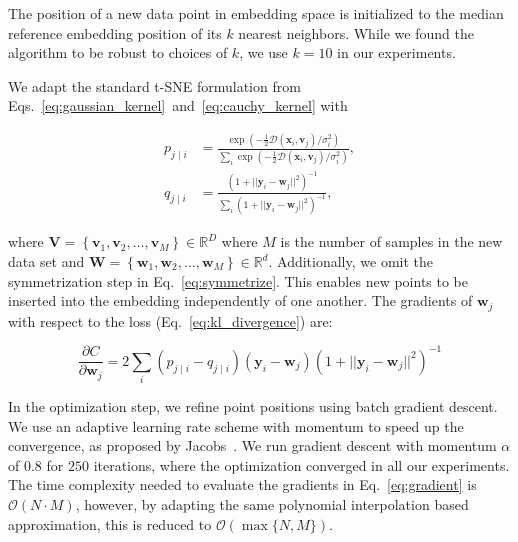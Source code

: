 \documentclass[runningheads]{llncs}
\begin{document}
The position of a new data point in embedding space is initialized to the
median reference embedding position of its $k$ nearest neighbors. While we
found the algorithm to be robust to choices of $k$, we use $k=10$ in our
experiments.

We adapt the standard t-SNE formulation from
Eqs.~\ref{eq:gaussian_kernel}~and~\ref{eq:cauchy_kernel} with

\begin{align}
p_{j \mid i} &= \frac{\exp \left ( -\frac{1}{2} \mathcal{D}(\mathbf{x}_i, \mathbf{v}_j) / \sigma_i^2 \right )}{\sum_{i} \exp \left ( -\frac{1}{2} \mathcal{D}(\mathbf{x}_i, \mathbf{v}_j) / \sigma_i^2 \right )}, \\
q_{j \mid i} &= \frac{\left ( 1 + || \mathbf{y}_i - \mathbf{w}_j ||^2 \right )^{-1}}{\sum_{i}\left ( 1 + || \mathbf{y}_i - \mathbf{w}_j ||^2 \right )^{-1}},
\end{align}

\noindent where $\mathbf{V} = \left \{ \mathbf{v}_1, \mathbf{v}_2, \dots,
\mathbf{v}_M \right \} \in \mathbb{R}^D$ where $M$ is the number of samples in
the new data set and $\mathbf{W} = \left \{ \mathbf{w}_1, \mathbf{w}_2, \dots,
\mathbf{w}_M \right \} \in \mathbb{R}^d$. Additionally, we omit the
symmetrization step in Eq.~\ref{eq:symmetrize}. This enables new points to be
inserted into the embedding independently of one another. The gradients of
$\mathbf{w}_j$ with respect to the loss (Eq.~\ref{eq:kl_divergence}) are:

\begin{equation}
\frac{\partial C}{\partial \mathbf{w}_j} = 2 \sum_i \left ( p_{j \mid i} - q_{j \mid i} \right ) \left ( \mathbf{y}_i - \mathbf{w}_j \right ) \left ( 1 + || \mathbf{y}_i - \mathbf{w}_j || ^2 \right )^{-1}
\label{eq:gradient}
\end{equation}

In the optimization step, we refine point positions using batch gradient
descent. We use an adaptive learning rate scheme with momentum to speed up the
convergence, as proposed by Jacobs~\cite{momentum,bh_tsne}. We run gradient
descent with momentum $\alpha$ of $0.8$ for $250$ iterations, where the
optimization converged in all our experiments. The time complexity needed to
evaluate the gradients in Eq.~\ref{eq:gradient} is $\mathcal{O}(N \cdot M)$,
however, by adapting the same polynomial interpolation based approximation,
this is reduced to $\mathcal{O}(\max \{ N, M \})$.
\end{document}

